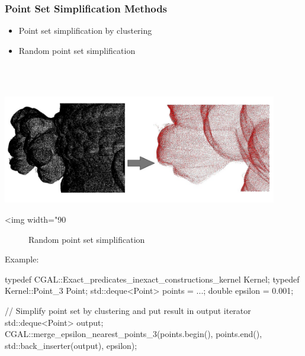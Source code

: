 \subsubsection{Point Set Simplification Methods}

\begin{itemize}
\item Point set simplification by clustering
\item Random point set simplification
\end{itemize}

  \\
  \\

\begin{center}
    \label{Surface_reconstruction_3-fig-random_simplification}
    \begin{ccTexOnly}
        \includegraphics[width=0.9\textwidth]{Surface_reconstruction_3/random_simplification} %
    \end{ccTexOnly}
    \begin{ccHtmlOnly}
        <img width="90%
    \end{ccHtmlOnly}
    \begin{figure}[h]
        \caption{Random point set simplification}
    \end{figure}
\end{center}

Example:

\begin{ccExampleCode}
typedef CGAL::Exact_predicates_inexact_constructions_kernel Kernel;
typedef Kernel::Point_3 Point;
std::deque<Point> points = ...;
double epsilon = 0.001;

// Simplify point set by clustering and put result in output iterator
std::deque<Point> output;
CGAL::merge_epsilon_nearest_points_3(points.begin(), points.end(),
                                     std::back_inserter(output),
                                     epsilon);
\end{ccExampleCode}


